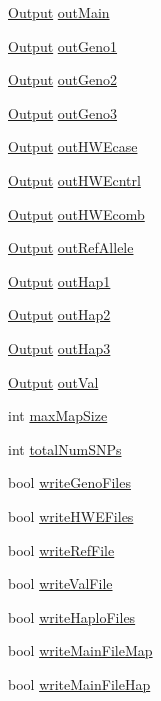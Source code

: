 \begin{DoxyCompactItemize}
\item 
\hyperlink{classOutput}{Output} \hyperlink{classSnpgwaOutput_af2ea8e1ff95cb8c724a8efc8056aff36}{outMain}
\item 
\hyperlink{classOutput}{Output} \hyperlink{classSnpgwaOutput_a28b7db56add2bec56ded7839697b41f6}{outGeno1}
\item 
\hyperlink{classOutput}{Output} \hyperlink{classSnpgwaOutput_a9c2018374715ff34aebfcac309962106}{outGeno2}
\item 
\hyperlink{classOutput}{Output} \hyperlink{classSnpgwaOutput_a7dfd380fcf3030f0fecd098cfafde32c}{outGeno3}
\item 
\hyperlink{classOutput}{Output} \hyperlink{classSnpgwaOutput_a9d728bc8033adddfdb54547720f13c73}{outHWEcase}
\item 
\hyperlink{classOutput}{Output} \hyperlink{classSnpgwaOutput_a53257881a705d01c0ab78d025da53d61}{outHWEcntrl}
\item 
\hyperlink{classOutput}{Output} \hyperlink{classSnpgwaOutput_a89f4ca8c3651b9006de67686fa957cfd}{outHWEcomb}
\item 
\hyperlink{classOutput}{Output} \hyperlink{classSnpgwaOutput_aa626994bf9305d3d227b0bbf9f839d7e}{outRefAllele}
\item 
\hyperlink{classOutput}{Output} \hyperlink{classSnpgwaOutput_a243da145889a8533a4cd3031ebe08576}{outHap1}
\item 
\hyperlink{classOutput}{Output} \hyperlink{classSnpgwaOutput_a3a52fcddc649c978401d22f0a30ddab1}{outHap2}
\item 
\hyperlink{classOutput}{Output} \hyperlink{classSnpgwaOutput_ae4caed4f983669568427b957aeb1cf9b}{outHap3}
\item 
\hyperlink{classOutput}{Output} \hyperlink{classSnpgwaOutput_a57f2a586abfd13f34cf89089c21aa449}{outVal}
\item 
int \hyperlink{classSnpgwaOutput_a5c90c26d5435ed4a5315312c8b6fabe5}{maxMapSize}
\item 
int \hyperlink{classSnpgwaOutput_a744eeba177ca22c6b8ab62b4ee62a235}{totalNumSNPs}
\item 
bool \hyperlink{classSnpgwaOutput_a5d21ad5bdb40c49a3f4042f89104ba56}{writeGenoFiles}
\item 
bool \hyperlink{classSnpgwaOutput_a7eb639c3eb44a97ed5bcb4cc39efa3ce}{writeHWEFiles}
\item 
bool \hyperlink{classSnpgwaOutput_aaaf80792184004da79d3fd9f06b800d2}{writeRefFile}
\item 
bool \hyperlink{classSnpgwaOutput_a92dbf1675db0fadf2123a8161df7e75c}{writeValFile}
\item 
bool \hyperlink{classSnpgwaOutput_a755bbf052c1f3936bd8972b78034d01b}{writeHaploFiles}
\item 
bool \hyperlink{classSnpgwaOutput_ac393eff50dde0ea8de38bbc56e05e135}{writeMainFileMap}
\item 
bool \hyperlink{classSnpgwaOutput_ab1081ec8129bf1e0184ab9341653262c}{writeMainFileHap}
\end{DoxyCompactItemize}
